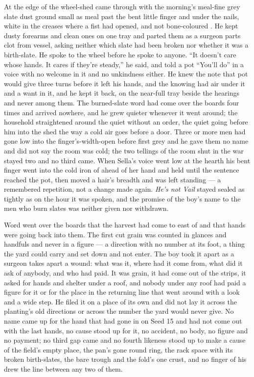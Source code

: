 At the edge of the wheel-shed  came through with the morning's meal-fine grey slate dust ground small as meal past the bent little finger and under the nails, white in the creases where a fist had opened, and not bone-coloured . He kept dusty forearms and clean ones on one tray and parted them as a surgeon parts clot from vessel, asking neither which slate had been broken nor whether it was a birth-slate. He spoke to the wheel before he spoke to anyone. “It doesn't care whose hands. It cares if they're steady,” he said, and told a pot “You'll do” in a voice with no welcome in it and no unkindness either. He knew the note that pot would give three turns before it left his hands, and the knowing had air under it and a want in it, and he kept it back, on the near-full tray beside the hearings and never among them. The burned-slate word had come over the boards four times and arrived nowhere, and he grew quieter whenever it went around; the household straightened around the quiet without an order, the quiet going before him into the shed the way a cold air goes before a door. Three or more men had gone low into the finger's-width-open  before first grey and he gave them no name and did not say the room was cold; the two tellings of the room shut in the war stayed two and no third came. When Sella's voice went low at the hearth his bent finger went into the cold iron of  ahead of her hand and held until the sentence reached the pot, then moved a hair's breadth and was left standing --- a remembered repetition, not a change made again. \emph{He's not Vail} stayed sealed as tightly as on the hour it was spoken, and the promise of the boy's name to the men who burn slates was neither given nor withdrawn.

Word went over the boards that the harvest had come to  east of  and that hands were going back into them. The first cut grain was counted in glances and handfuls and never in a figure --- a direction with no number at its foot, a thing the yard could carry and set down and not enter. The boy took it apart as a surgeon takes apart a wound: what was it, where had it come from, what did it ask of anybody, and who had paid. It was grain, it had come out of the strips, it asked for hands and shelter under a roof, and nobody under any roof had paid a figure for it or for the place in the returning line that went around with a look and a wide step. He filed it on a place of its own and did not lay it across the planting's old directions or across the number the yard would never give. No name came up for the hand that had gone in on Seed 15 and had not come out with the last hands, no cause stood up for it, no accident, no body, no figure and no payment; no third gap came and no fourth likeness stood up to make a cause of the field's empty place, the pan's gone round ring, the rack space with its broken birth-slates, the bare trough and the fold's one crust, and no finger of his drew the line between any two of them.

